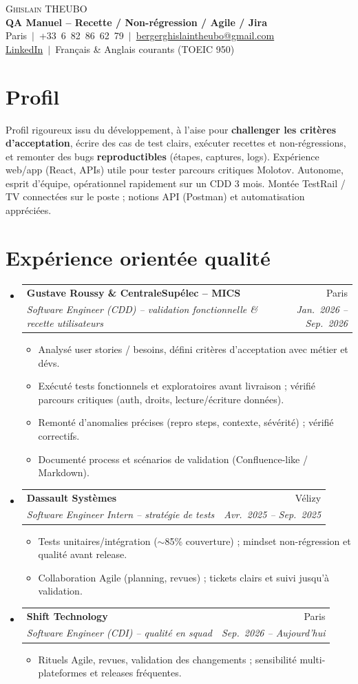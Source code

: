 \documentclass[a4paper,10.5pt]{article}
\makeatletter
\newcommand{\resumeItem}[1]{\item\small{#1}}
\newcommand{\resumeSubheading}[4]{\vspace{3pt}\item\begin{tabular*}{0.97\textwidth}[t]{l@{\extracolsep{\fill}}r}\textbf{#1}&{#2}\\\textit{\small #3}&\textit{\small #4}\\\end{tabular*}\vspace{1pt}}
\newcommand{\resumeSubHeadingListStart}{\begin{itemize}[leftmargin=0.08in,label={}]}
\newcommand{\resumeSubHeadingListEnd}{\end{itemize}}
\makeatother
\begin{document}
\begin{center}
{\Huge \scshape Ghislain THEUBO}\\[3pt]
\textbf{QA Manuel -- Recette / Non-r\'egression / Agile / Jira}\\[2pt]
\small Paris $\,|\,$ +33~6~82~86~62~79 $\,|\,$ \href{mailto:bergerghislaintheubo@gmail.com}{bergerghislaintheubo@gmail.com}\\[1pt]
\href{https://www.linkedin.com/in/berger-ghislain}{LinkedIn} $\,|\,$ Fran\c{c}ais \& Anglais courants (TOEIC 950)
\end{center}

\section{Profil}
\small{
Profil rigoureux issu du d\'eveloppement, \`a l'aise pour \textbf{challenger les crit\`eres d'acceptation},
\'ecrire des cas de test clairs, ex\'ecuter recettes et non-r\'egressions, et remonter des bugs
\textbf{reproductibles} (\'etapes, captures, logs). Exp\'erience web/app (React, APIs) utile pour tester
parcours critiques Molotov. Autonome, esprit d'\'equipe, op\'erationnel rapidement sur un CDD 3 mois.
Mont\'ee TestRail / TV connect\'ees sur le poste ; notions API (Postman) et automatisation appr\'eci\'ees.
}

\section{Exp\'erience orient\'ee qualit\'e}
\resumeSubHeadingListStart
  \resumeSubheading
    {Gustave Roussy \& CentraleSup\'elec -- MICS}{Paris}
    {Software Engineer (CDD) -- validation fonctionnelle \& recette utilisateurs}{Jan.~2026 -- Sep.~2026}
    \begin{itemize}
      \resumeItem{Analys\'e user stories / besoins, d\'efini crit\`eres d'acceptation avec m\'etier et d\'evs.}
      \resumeItem{Ex\'ecut\'e tests fonctionnels et exploratoires avant livraison ; v\'erifi\'e parcours critiques (auth, droits, lecture/\'ecriture donn\'ees).}
      \resumeItem{Remont\'e d'anomalies pr\'ecises (repro steps, contexte, s\'ev\'erit\'e) ; v\'erifi\'e correctifs.}
      \resumeItem{Document\'e process et sc\'enarios de validation (Confluence-like / Markdown).}
    \end{itemize}
  \resumeSubheading
    {Dassault Syst\`emes}{V\'elizy}
    {Software Engineer Intern -- strat\'egie de tests}{Avr.~2025 -- Sep.~2025}
    \begin{itemize}
      \resumeItem{Tests unitaires/int\'egration ($\sim$85\% couverture) ; mindset non-r\'egression et qualit\'e avant release.}
      \resumeItem{Collaboration Agile (planning, revues) ; tickets clairs et suivi jusqu'\`a validation.}
    \end{itemize}
  \resumeSubheading
    {Shift Technology}{Paris}
    {Software Engineer (CDI) -- qualit\'e en squad}{Sep.~2026 -- Aujourd'hui}
    \begin{itemize}
      \resumeItem{Rituels Agile, revues, validation des changements ; sensibilit\'e multi-plateformes et releases fr\'equentes.}
    \end{itemize}
\resumeSubHeadingListEnd
\end{document}
